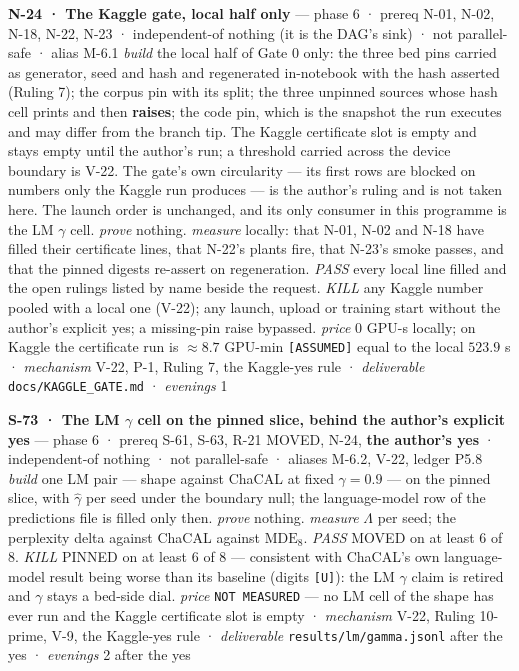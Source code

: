 \documentclass[11pt,a4paper]{article}
\theoremstyle{plain}
\theoremstyle{definition}
\theoremstyle{remark}
\begin{document}
\textbf{N-24 · The Kaggle gate, local half only} --- phase 6 · prereq
N-01, N-02, N-18, N-22, N-23 · independent-of nothing (it is the DAG's
sink) · not parallel-safe · alias M-6.1 \emph{build} the local half of
Gate 0 only: the three bed pins carried as generator, seed and hash and
regenerated in-notebook with the hash asserted (Ruling 7); the corpus
pin with its split; the three unpinned sources whose hash cell prints
and then \textbf{raises}; the code pin, which is the snapshot the run
executes and may differ from the branch tip. The Kaggle certificate slot
is empty and stays empty until the author's run; a threshold carried
across the device boundary is V-22. The gate's own circularity --- its
first rows are blocked on numbers only the Kaggle run produces --- is
the author's ruling and is not taken here. The launch order is
unchanged, and its only consumer in this programme is the LM \(\gamma\)
cell. \emph{prove} nothing. \emph{measure} locally: that N-01, N-02 and
N-18 have filled their certificate lines, that N-22's plants fire, that
N-23's smoke passes, and that the pinned digests re-assert on
regeneration. \emph{PASS} every local line filled and the open rulings
listed by name beside the request. \emph{KILL} any Kaggle number pooled
with a local one (V-22); any launch, upload or training start without
the author's explicit yes; a missing-pin raise bypassed. \emph{price}
\(0\) GPU-s locally; on Kaggle the certificate run is \(\approx8.7\)
GPU-min \texttt{{[}ASSUMED{]}} equal to the local \(523.9\) s ·
\emph{mechanism} V-22, P-1, Ruling 7, the Kaggle-yes rule ·
\emph{deliverable} \texttt{docs/KAGGLE\_GATE.md} · \emph{evenings} 1

\textbf{S-73 · The LM \(\gamma\) cell on the pinned slice, behind the
author's explicit yes} --- phase 6 · prereq S-61, S-63, R-21 MOVED,
N-24, \textbf{the author's yes} · independent-of nothing · not
parallel-safe · aliases M-6.2, V-22, ledger P5.8 \emph{build} one LM
pair --- shape against ChaCAL at fixed \(\gamma=0.9\) --- on the pinned
slice, with \(\hat\gamma\) per seed under the boundary null; the
language-model row of the predictions file is filled only then.
\emph{prove} nothing. \emph{measure} \(\Lambda\) per seed; the
perplexity delta against ChaCAL against \(\mathrm{MDE}_8\). \emph{PASS}
MOVED on at least 6 of 8. \emph{KILL} PINNED on at least 6 of 8 ---
consistent with ChaCAL's own language-model result being worse than its
baseline (digits \texttt{{[}U{]}}): the LM \(\gamma\) claim is retired
and \(\gamma\) stays a bed-side dial. \emph{price}
\texttt{NOT\ MEASURED} --- no LM cell of the shape has ever run and the
Kaggle certificate slot is empty · \emph{mechanism} V-22, Ruling
10-prime, V-9, the Kaggle-yes rule · \emph{deliverable}
\texttt{results/lm/gamma.jsonl} after the yes · \emph{evenings} 2 after
the yes
\end{document}

